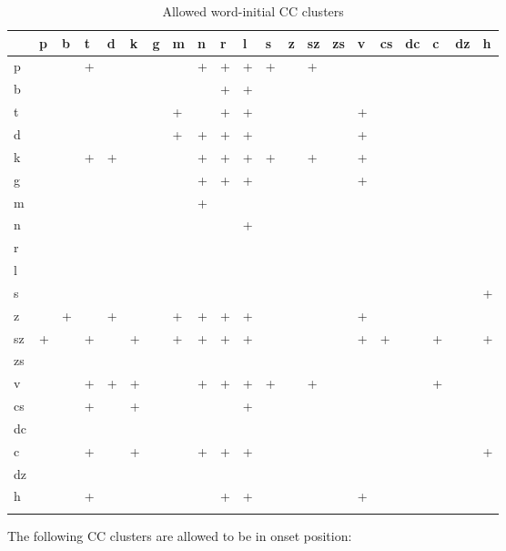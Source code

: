 \begin{table}[h!]
	\small \centering
	\caption{Allowed word-initial CC clusters}
	\begin{tabularx}{\textwidth}{YMMMMMMMMMMMMMMMMMMMM}
		\toprule
		&p&b&t&d&k&g&m&n&r&l&s&z&sz&zs&v&cs&dc&c&dz&h\\
		\midrule
		p&&&+&&&&&+&+&+&+&&+&&&&&&&\\
		b&&&&&&&&&+&+&&&&&&&&&&\\
		t&&&&&&&+&&+&+&&&&&+&&&&&\\
		d&&&&&&&+&+&+&+&&&&&+&&&&&\\
		k&&&+&+&&&&+&+&+&+&&+&&+&&&&&\\
		g&&&&&&&&+&+&+&&&&&+&&&&&\\
		m&&&&&&&&+&&&&&&&&&&&&\\
		n&&&&&&&&&&+&&&&&&&&&&\\
		r&&&&&&&&&&&&&&&&&&&&\\
		l&&&&&&&&&&&&&&&&&&&&\\
		s&&&&&&&&&&&&&&&&&&&&+\\
		z&&+&&+&&&+&+&+&+&&&&&+&&&&&\\
		sz&+&&+&&+&&+&+&+&+&&&&&+&+&&+&&+\\
		zs&&&&&&&&&&&&&&&&&&&&\\
		v&&&+&+&+&&&+&+&+&+&&+&&&&&+&&\\
		cs&&&+&&+&&&&&+&&&&&&&&&&\\
		dc&&&&&&&&&&&&&&&&&&&&\\
		c&&&+&&+&&&+&+&+&&&&&&&&&&+\\
		dz&&&&&&&&&&&&&&&&&&&&\\
		h&&&+&&&&&&+&+&&&&&+&&&&&\\
		\bottomrule
		\addlinespace
	\end{tabularx}
\end{table}

\par The following CC clusters are allowed to be in onset position:

